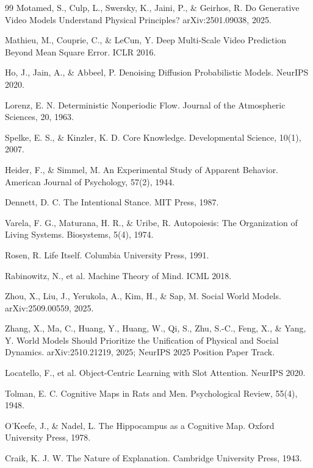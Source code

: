 \documentclass[10pt,fontset=fandol]{ctexart}
\begin{document}
\begin{thebibliography}{99}
Motamed, S., Culp, L., Swersky, K., Jaini, P., \& Geirhos, R. Do Generative Video Models Understand Physical Principles? arXiv:2501.09038, 2025.

Mathieu, M., Couprie, C., \& LeCun, Y. Deep Multi-Scale Video Prediction Beyond Mean Square Error. ICLR 2016.

Ho, J., Jain, A., \& Abbeel, P. Denoising Diffusion Probabilistic Models. NeurIPS 2020.

Lorenz, E. N. Deterministic Nonperiodic Flow. Journal of the Atmospheric Sciences, 20, 1963.

Spelke, E. S., \& Kinzler, K. D. Core Knowledge. Developmental Science, 10(1), 2007.

Heider, F., \& Simmel, M. An Experimental Study of Apparent Behavior. American Journal of Psychology, 57(2), 1944.

Dennett, D. C. The Intentional Stance. MIT Press, 1987.

Varela, F. G., Maturana, H. R., \& Uribe, R. Autopoiesis: The Organization of Living Systems. Biosystems, 5(4), 1974.

Rosen, R. Life Itself. Columbia University Press, 1991.

Rabinowitz, N., et al. Machine Theory of Mind. ICML 2018.

Zhou, X., Liu, J., Yerukola, A., Kim, H., \& Sap, M. Social World Models. arXiv:2509.00559, 2025.

Zhang, X., Ma, C., Huang, Y., Huang, W., Qi, S., Zhu, S.-C., Feng, X., \& Yang, Y. World Models Should Prioritize the Unification of Physical and Social Dynamics. arXiv:2510.21219, 2025; NeurIPS 2025 Position Paper Track.

Locatello, F., et al. Object-Centric Learning with Slot Attention. NeurIPS 2020.

Tolman, E. C. Cognitive Maps in Rats and Men. Psychological Review, 55(4), 1948.

O'Keefe, J., \& Nadel, L. The Hippocampus as a Cognitive Map. Oxford University Press, 1978.

Craik, K. J. W. The Nature of Explanation. Cambridge University Press, 1943.


\end{thebibliography}
\end{document}
